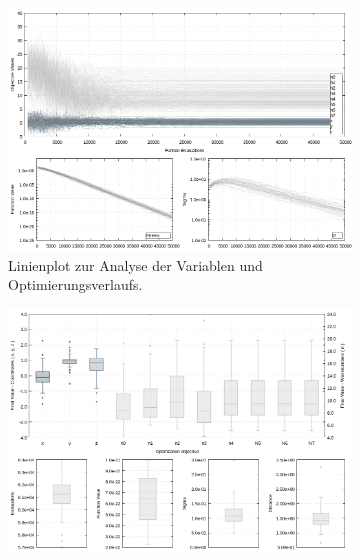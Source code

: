 \begin{landscape}
\begin{figure}[!ht]
	\caption[Evolutionsverlauf der Ergebnisse]{ Diese Grafik zeigt den Verlauf der Evolution. Es werden die Beiden letzten Experimente $2099$ (oben, ideale Messdaten) und $3099$ (unten, reale Messdaten) gezeigt. Diese Plots dienen nur der Einschätzung über den generellen Verlauf der Evolution. Es ist nicht sinnvoll sie für alle Experimente hier darzustellen. Anhand des Boxplots (Mitte) erkennend man, dass die Resultate für ideale Messwerte nicht so stark streuen, die Lösung der realen Messdaten ist den der idealen mind. Ebenbürtig. Es zeigt sich sogar, dass weniger Evaluationen der Zielfunktion bei den realen Werten nötig waren.}
	\label{fig:results3}
	\vspace{3mm}
	\centering
	\begin{subfigure}[t]{0.45\textheight}
	     \centering
	     \includegraphics[width=\textwidth]{img/evo/lines2089.png}
	             \caption{Linienplot zur Analyse der Variablen und Optimierungsverlaufs.}
	\end{subfigure}
	\qquad
	\begin{subfigure}[t]{0.45\textheight}
		\centering
	     \includegraphics[width=\textwidth]{img/evo/boxes2089.png}

\end{subfigure}
\end{figure}
\end{landscape}
